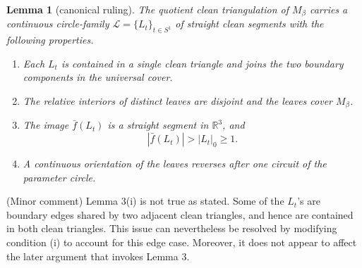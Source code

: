 \documentclass[12pt]{article}
\newtheorem{lemma}[theorem]{Lemma}
\newcommand{\R}{\mathbb R}
\newcommand{\review}[1]{\begin{reviewbox}#1\end{reviewbox}}
\begin{document}
\begin{lemma}[canonical ruling]
The quotient clean triangulation of \(M_\beta\) carries a continuous circle-family \(\mathcal L=\{L_t\}_{t\in S^1}\) of straight clean segments with the following properties.
\begin{enumerate}[label=\textup{(\roman*)}]
\item Each \(L_t\) is contained in a single clean triangle and joins the two boundary components in the universal cover.
\item The relative interiors of distinct leaves are disjoint and the leaves cover \(M_\beta\).
\item The image \(\bar f(L_t)\) is a straight segment in \(\R^3\), and
\[
|\bar f(L_t)|>|L_t|_0\ge 1.
\]
\item A continuous orientation of the leaves reverses after one circuit of the parameter circle.
\end{enumerate}
\end{lemma}

\review{(Minor comment) Lemma 3(i) is not true as stated. Some of the $L_t$'s are boundary edges shared by two adjacent clean triangles, and hence are contained in both clean triangles. This issue can nevertheless be resolved by modifying condition (i) to account for this edge case. Moreover, it does not appear to affect the later argument that invokes Lemma 3.}
\end{document}
